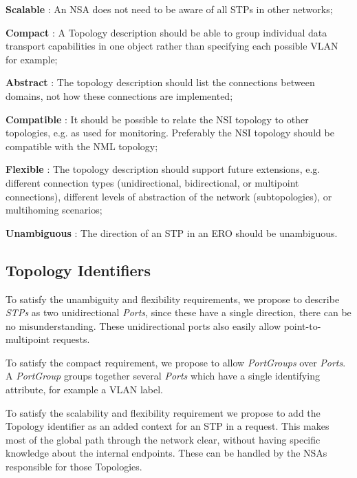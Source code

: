 \documentclass[12pt]{article}  %
\begin{document}
\begin{description}
    \item  \textbf{Scalable} : An NSA does not need to be 
aware of all STPs in other networks;
    \item \textbf{Compact} : A Topology description should 
be able to group individual data transport capabilities in one object rather than 
specifying each possible VLAN for example;

\item \textbf{Abstract} : The topology description 
should list the connections between domains, not how these connections are implemented;

\item  \textbf{Compatible} : It should be possible to 
relate the NSI topology to other topologies, e.g. as used for monitoring. Preferably 
the NSI topology should be compatible with the NML topology;

\item  \textbf{Flexible} : The topology description 
should support future extensions, e.g. different connection types (unidirectional, 
bidirectional, or multipoint connections), different levels of abstraction of the 
network (subtopologies), or multihoming scenarios;

\item  \textbf{Unambiguous} : The direction of an STP in an ERO should be unambiguous.
\end{description}


\subsection{Topology Identifiers}

To satisfy the unambiguity and flexibility requirements, we propose 
to describe \emph{STPs} as two unidirectional \emph{Ports}, since these have a single direction, 
there can be no misunderstanding. These unidirectional ports also easily allow 
point-to-multipoint requests.

To satisfy the compact requirement, we propose to allow \emph{PortGroups} 
over \emph{Ports}. A \emph{PortGroup} groups together several \emph{Ports} which have a single identifying 
attribute, for example a VLAN label.

To satisfy the scalability and flexibility requirement we propose 
to add the Topology identifier as an added context for an STP in a request. This makes 
most of the global path through the network clear, without having specific knowledge 
about the internal endpoints. These can be handled by the NSAs responsible for 
those Topologies.
\end{document}
